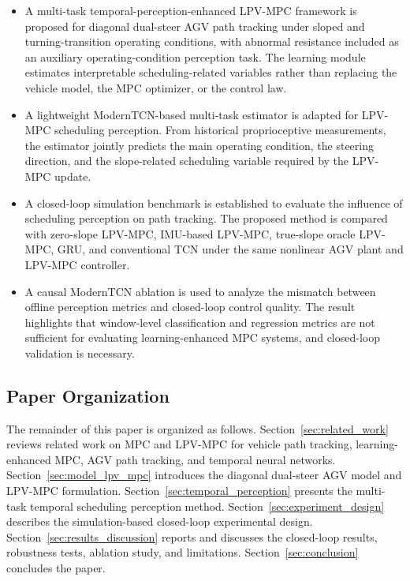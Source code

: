 \documentclass{ieeeaccess}
\begin{document}
\begin{itemize}

\item A multi-task temporal-perception-enhanced LPV-MPC framework is proposed for diagonal dual-steer AGV path tracking under sloped and turning-transition operating conditions, with abnormal resistance included as an auxiliary operating-condition perception task. The learning module estimates interpretable scheduling-related variables rather than replacing the vehicle model, the MPC optimizer, or the control law.


\item A lightweight ModernTCN-based multi-task estimator is adapted for LPV-MPC scheduling perception. From historical proprioceptive measurements, the estimator jointly predicts the main operating condition, the steering direction, and the slope-related scheduling variable required by the LPV-MPC update.


\item A closed-loop simulation benchmark is established to evaluate the influence of scheduling perception on path tracking. The proposed method is compared with zero-slope LPV-MPC, IMU-based LPV-MPC, true-slope oracle LPV-MPC, GRU, and conventional TCN under the same nonlinear AGV plant and LPV-MPC controller.


\item A causal ModernTCN ablation is used to analyze the mismatch between offline perception metrics and closed-loop control quality. The result highlights that window-level classification and regression metrics are not sufficient for evaluating learning-enhanced MPC systems, and closed-loop validation is necessary.

\end{itemize}



\subsection{Paper Organization}



The remainder of this paper is organized as follows. Section~\ref{sec:related_work} reviews related work on MPC and LPV-MPC for vehicle path tracking, learning-enhanced MPC, AGV path tracking, and temporal neural networks. Section~\ref{sec:model_lpv_mpc} introduces the diagonal dual-steer AGV model and LPV-MPC formulation. Section~\ref{sec:temporal_perception} presents the multi-task temporal scheduling perception method. Section~\ref{sec:experiment_design} describes the simulation-based closed-loop experimental design. Section~\ref{sec:results_discussion} reports and discusses the closed-loop results, robustness tests, ablation study, and limitations. Section~\ref{sec:conclusion} concludes the paper.
\end{document}
